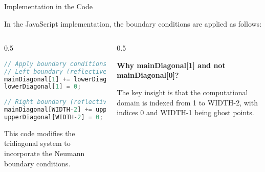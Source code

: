 \documentclass{beamer}
\begin{document}
\begin{frame}[fragile]{Implementation in the Code}
    \vspace{-0.5cm}
    
    In the JavaScript implementation, the boundary conditions are applied as follows:
    
    \begin{columns}
        \begin{column}{0.5\textwidth}
            
            \begin{lstlisting}[language=JavaScript]
// Apply boundary conditions for the x-direction
// Left boundary (reflective)
mainDiagonal[1] += lowerDiagonal[1]; 
lowerDiagonal[1] = 0;
        
// Right boundary (reflective)
mainDiagonal[WIDTH-2] += upperDiagonal[WIDTH-2]; 
upperDiagonal[WIDTH-2] = 0;
            \end{lstlisting}
            
            This code modifies the tridiagonal system to incorporate the Neumann boundary conditions.
        \end{column}
        
        \begin{column}{0.5\textwidth}
            
            \textbf{Why mainDiagonal[1] and not mainDiagonal[0]?}
            
            The key insight is that the computational domain is indexed from 1 to WIDTH-2, with indices 0 and WIDTH-1 being ghost points.
            
\end{column}
\end{columns}
\end{frame}
\end{document}
